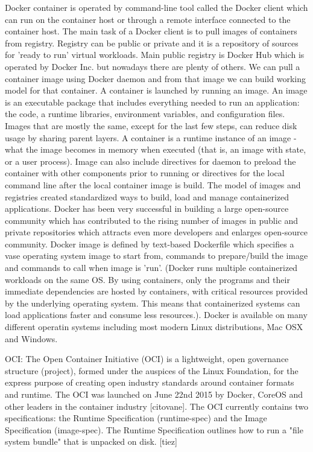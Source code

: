 Docker container is operated by command-line tool called the Docker client which can run on the container host or through a remote interface connected to the container host. The main task of a Docker client is to pull images of containers from registry. Registry can be public or private and it is a repository of sources for 'ready to run' virtual workloads. Main public registry is Docker Hub which is operated by Docker Inc. but nowadays there are plenty of others. We can pull a container image using Docker daemon and from that image we can build working model for that container. A container is launched by running an image. An image is an executable package that includes everything needed to run an application: the code, a runtime libraries, environment variables, and configuration files. Images that are mostly the same, except for the last few steps, can reduce disk usage by sharing parent layers. A container is a runtime instance of an image - what the image becomes in memory when executed (that is, an image with state, or a user process). Image can also include directives for daemon to preload the container with other components prior to running or directives for the local command line after the local container image is build. The model of images and registries created standardized ways to build, load and manage containerized applications. Docker has been very successful in building a large open-source community which has contributed to the rising number of images in public and private repositories which attracts even more developers and enlarges open-source community. Docker image is defined by text-based Dockerfile which specifies a vase operating system image to start from, commands to prepare/build the image and commands to call when image is 'run'. (Docker runs multiple containerized workloads on the same OS. By using containers, only the programs and their immediate dependencies are hosted by containers, with critical resources provided by the underlying operating system.  This means that containerized systems can load applications faster and consume less resources.). Docker is available on many different operatin systems including most modern Linux distributions, Mac OSX and Windows.

OCI: The Open Container Initiative (OCI) is a lightweight, open governance structure (project), formed under the auspices of the Linux Foundation, for the express purpose of creating open industry standards around container formats and runtime. The OCI was launched on June 22nd 2015 by Docker, CoreOS and other leaders in the container industry [citovane]. The OCI currently contains two specifications: the Runtime Specification (runtime-spec) and the Image Specification (image-spec). The Runtime Specification outlines how to run a "file system bundle" that is unpacked on disk. [tiez]


